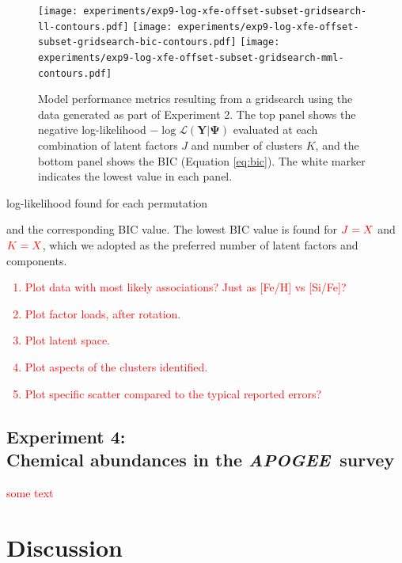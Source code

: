 \documentclass[twocolumn]{aastex62}
\newcommand{\project}[1]{\textsl{#1}}
\newcommand{\APOGEE}{\project{APOGEE}}
\newcommand{\todo}[1]{\textcolor{red}{#1}}
\newcommand{\vect}[1]{\boldsymbol{\mathbf{#1}}}
\renewcommand{\vec}[1]{\vect{#1}}
\newcommand{\data}{\textbf{Y}}
\newcommand{\NumLatentFactors}{J}
\newcommand{\NumComponents}{K}
\begin{document}
\begin{figure}
	\texttt{[image: experiments/exp9-log-xfe-offset-subset-gridsearch-ll-contours.pdf]}
	\texttt{[image: experiments/exp9-log-xfe-offset-subset-gridsearch-bic-contours.pdf]}
	\texttt{[image: experiments/exp9-log-xfe-offset-subset-gridsearch-mml-contours.pdf]}
    \caption{Model performance metrics resulting from a gridsearch using the
    		 data generated as part of Experiment 2. The top 
		 	 panel shows the negative log-likelihood 
			 $-\log{\mathcal{L}\left(\data|\vec\Psi\right)}$ 
			 evaluated at each combination of latent factors $J$ and number 
			 of clusters $K$, and the bottom panel shows the BIC (Equation \ref{eq:bic}).
			 The white marker indicates the 
			 lowest value in each panel.
				}
    \label{fig:experiment-9-gridsearch}
\end{figure}




 log-likelihood found for each permutation

and the corresponding
BIC value. The lowest BIC value is found for $\todo{\NumLatentFactors = X}$ and
$\todo{\NumComponents = X}$, which we adopted as the preferred number of latent
factors and components.



\todo{
\begin{enumerate}
	\item Plot data with most likely associations? Just as [Fe/H] vs [Si/Fe]?
	\item Plot factor loads, after rotation.
	\item Plot latent space.
	\item Plot aspects of the clusters identified.
	\item Plot specific scatter compared to the typical reported errors?
\end{enumerate}
}


\subsection{Experiment 4:\\Chemical abundances in the \APOGEE\ survey}
\label{sec:exp5}

\todo{some text}


\section{Discussion} \label{sec:discussion}


\end{document}
